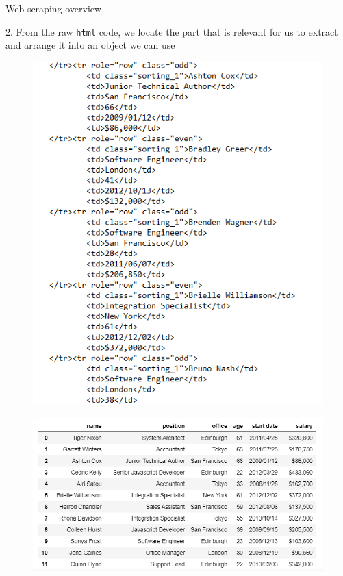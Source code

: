 \documentclass[aspectratio=169]{beamer}
\begin{document}
\begin{frame}{Web scraping overview}

	2. From the raw \texttt{html} code, we locate the part that is relevant for us to extract and arrange it into an object we can use

	\begin{multicols}{2}

		\begin{figure}
			\centering
			\includegraphics[width=0.7\linewidth]{img/html_relevant.png}
		\end{figure}
		\begin{figure}
			\centering
			\includegraphics[width=\linewidth]{img/html_final.png}
		\end{figure}

	\end{multicols}

\end{frame}
\end{document}
